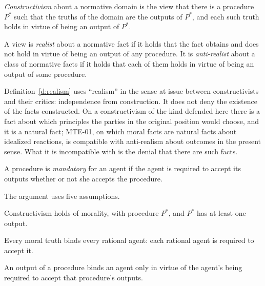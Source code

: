 \documentclass{situationist-preprint}
\begin{document}
\begin{definition}[Constructivism]\label{d:constructivism}
\emph{Constructivism} about a normative domain is the view that there is a procedure $P^*$ such that the truths of the domain are the outputs of $P^*$, and each such truth holds in virtue of being an output of $P^*$.
\end{definition}

\begin{definition}\label{d:realism}
A view is \emph{realist} about a normative fact if it holds that the fact obtains and does not hold in virtue of being an output of any procedure. It is \emph{anti-realist} about a class of normative facts if it holds that each of them holds in virtue of being an output of some procedure.
\end{definition}

Definition~\ref{d:realism} uses \enquote{realism} in the sense at issue between constructivists and their critics: independence from construction. It does not deny the existence of the facts constructed. On a constructivism of the kind defended here there is a fact about which principles the parties in the original position would choose, and it is a natural fact; MTE-01, on which moral facts are natural facts about idealized reactions, is compatible with anti-realism about outcomes in the present sense. What it is incompatible with is the denial that there are such facts.

\begin{definition}\label{d:mandatory}
A procedure is \emph{mandatory} for an agent if the agent is required to accept its outputs whether or not she accepts the procedure.
\end{definition}

The argument uses five assumptions.

\begin{assumption}[Construction]\label{a:construction}
Constructivism holds of morality, with procedure $P^*$, and $P^*$ has at least one output.
\end{assumption}

\begin{assumption}[Authority]\label{a:authority}
Every moral truth binds every rational agent: each rational agent is required to accept it.
\end{assumption}

\begin{assumption}[Transmission]\label{a:transmission}
An output of a procedure binds an agent only in virtue of the agent's being required to accept that procedure's outputs.
\end{assumption}
\end{document}
